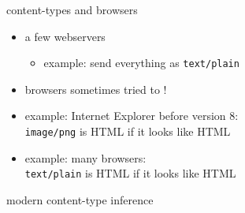 \begin{frame}{content-types and browsers}
    \begin{itemize}
    \item a few webservers 
        \begin{itemize}
            \item example: send everything as \texttt{text/plain}
        \end{itemize}
    \item browsers sometimes tried to !
    \item example: Internet Explorer before version 8: \\
        \texttt{image/png} is HTML if it looks like HTML
    \item example: many browsers: \\
        \texttt{text/plain} is HTML if it looks like HTML
    \end{itemize}
\end{frame}

\begin{frame}{modern content-type inference}
\end{frame}
